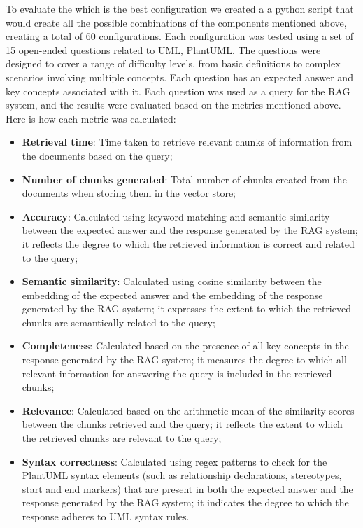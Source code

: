To evaluate the which is the best configuration we created a a python script that would create all the possible combinations of the components mentioned above, creating a total of 60 configurations. Each configuration was tested using a set of 15 open-ended questions related to UML, PlantUML. The questions were designed to cover a range of difficulty levels, from basic definitions to complex scenarios involving multiple concepts. Each question has an expected answer and key concepts associated with it.
Each question was used as a query for the RAG system, and the results were evaluated based on the metrics mentioned above. Here is how each metric was calculated:
\begin{itemize}
    \item \textbf{Retrieval time}: Time taken to retrieve relevant chunks of information from the documents based on the query;
    \item \textbf{Number of chunks generated}: Total number of chunks created from the documents when storing them in the vector store;
    \item \textbf{Accuracy}: Calculated using keyword matching and semantic similarity between the expected answer and the response generated by the RAG system; it reflects the degree to which the retrieved information is correct and related to the query;
    \item \textbf{Semantic similarity}: Calculated using cosine similarity between the embedding of the expected answer and the embedding of the response generated by the RAG system; it expresses the extent to which the retrieved chunks are semantically related to the query;
    \item \textbf{Completeness}: Calculated based on the presence of all key concepts in the response generated by the RAG system; it measures the degree to which all relevant information for answering the query is included in the retrieved chunks;
    \item \textbf{Relevance}: Calculated based on the arithmetic mean of the similarity scores between the chunks retrieved and the query; it reflects the extent to which the retrieved chunks are relevant to the query;
    \item \textbf{Syntax correctness}: Calculated using regex patterns to check for the PlantUML syntax elements (such as relationship declarations, stereotypes, start and end markers) that are present in both the expected answer and the response generated by the RAG system; it indicates the degree to which the response adheres to UML syntax rules.
\end{itemize}

